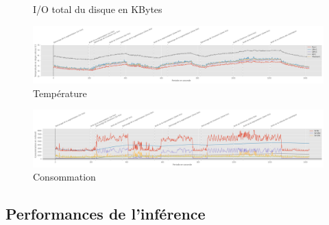 {\begin{landscape}
\begin{figure}[H]
      \caption{I/O total du disque en KBytes}
      \label{fig:io_totaldisk}
   \end{figure} 
   \begin{figure}[H]
      \centering
      \includegraphics[width=1.5\textwidth]{temperature}
      \caption{Température}
      \label{fig:temperature}
   \end{figure} 
   \begin{figure}[H]
      \centering
      \includegraphics[width=1.5\textwidth]{consommation}
      \caption{Consommation}
      \label{fig:consommation}
   \end{figure}
   \end{landscape}
   \clearpage
   \newpage
}
\subsection{Performances de l'inférence}
